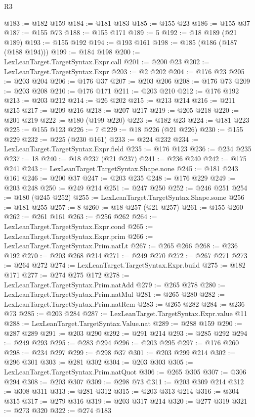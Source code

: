 \begin{lexlean}{R3}
\begin{coremodule}
@183 := @182 @159
@184 := @181 @183
@185 := @155 @23
@186 := @155 @37
@187 := @155 @73
@188 := @155 @171
@189 := 5
@192 := @18 @189 (@21 @189)
@193 := @155 @192
@194 := @193 @161
@198 := @185 (@186 (@187 (@188 @194)))
@199 := @184 @198
@200 := LexLeanTarget.TargetSyntax.Expr.call
@201 := @200 @23
@202 := LexLeanTarget.TargetSyntax.Expr
@203 := @2 @202
@204 := @176 @23
@205 := @203 @204
@206 := @176 @37
@207 := @203 @206
@208 := @176 @73
@209 := @203 @208
@210 := @176 @171
@211 := @203 @210
@212 := @176 @192
@213 := @203 @212
@214 := @26 @202
@215 := @213 @214
@216 := @211 @215
@217 := @209 @216
@218 := @207 @217
@219 := @205 @218
@220 := @201 @219
@222 := @180 (@199 @220)
@223 := @182 @23
@224 := @181 @223
@225 := @155 @123
@226 := 7
@229 := @18 @226 (@21 @226)
@230 := @155 @229
@232 := @225 (@230 @161)
@233 := @224 @232
@234 := LexLeanTarget.TargetSyntax.Expr.field
@235 := @176 @123
@236 := @234 @235
@237 := 18
@240 := @18 @237 (@21 @237)
@241 := @236 @240
@242 := @175 @241
@243 := LexLeanTarget.TargetSyntax.Shape.none
@245 := @181 @243 @161
@246 := @200 @37
@247 := @203 @235
@248 := @176 @229
@249 := @203 @248
@250 := @249 @214
@251 := @247 @250
@252 := @246 @251
@254 := @180 (@245 @252)
@255 := LexLeanTarget.TargetSyntax.Shape.some
@256 := @181 @255
@257 := 8
@260 := @18 @257 (@21 @257)
@261 := @155 @260
@262 := @261 @161
@263 := @256 @262
@264 := LexLeanTarget.TargetSyntax.Expr.cond
@265 := LexLeanTarget.TargetSyntax.Expr.prim
@266 := LexLeanTarget.TargetSyntax.Prim.natLt
@267 := @265 @266
@268 := @236 @192
@270 := @203 @268 @214
@271 := @249 @270
@272 := @267 @271
@273 := @264 @272
@274 := LexLeanTarget.TargetSyntax.Expr.build
@275 := @182 @171
@277 := @274 @275 @172
@278 := LexLeanTarget.TargetSyntax.Prim.natAdd
@279 := @265 @278
@280 := LexLeanTarget.TargetSyntax.Prim.natMul
@281 := @265 @280
@282 := LexLeanTarget.TargetSyntax.Prim.natRem
@283 := @265 @282
@284 := @236 @73
@285 := @203 @284
@287 := LexLeanTarget.TargetSyntax.Expr.value @11
@288 := LexLeanTarget.TargetSyntax.Value.nat
@289 := @288 @159
@290 := @287 @289
@291 := @203 @290
@292 := @291 @214
@293 := @285 @292
@294 := @249 @293
@295 := @283 @294
@296 := @203 @295
@297 := @176 @260
@298 := @234 @297
@299 := @298 @37
@301 := @203 @299 @214
@302 := @296 @301
@303 := @281 @302
@304 := @203 @303
@305 := LexLeanTarget.TargetSyntax.Prim.natQuot
@306 := @265 @305
@307 := @306 @294
@308 := @203 @307
@309 := @298 @73
@311 := @203 @309 @214
@312 := @308 @311
@313 := @281 @312
@315 := @203 @313 @214
@316 := @304 @315
@317 := @279 @316
@319 := @203 @317 @214
@320 := @277 @319
@321 := @273 @320
@322 := @274 @183

\end{coremodule}
\end{lexlean}

